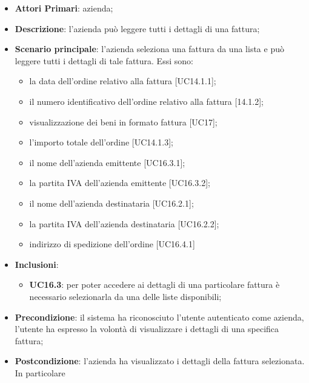\begin{itemize}
	\item \textbf{Attori Primari}: azienda;
	\item \textbf{Descrizione}: l'azienda può leggere tutti i dettagli di una fattura;
	\item \textbf{Scenario principale}: l'azienda seleziona una fattura da una lista e può leggere tutti i dettagli di tale fattura. Essi sono:
	\begin{itemize}
		\item la data dell'ordine relativo alla fattura [UC14.1.1];
		\item il numero identificativo dell'ordine relativo alla fattura [14.1.2];
		\item visualizzazione dei beni in formato fattura [UC17];
		\item l'importo totale dell'ordine [UC14.1.3];
		\item il nome dell'azienda emittente [UC16.3.1];
		\item la partita IVA dell'azienda emittente [UC16.3.2];
		\item il nome dell'azienda destinataria [UC16.2.1];
		\item la partita IVA dell'azienda destinataria [UC16.2.2];
		\item indirizzo di spedizione dell'ordine [UC16.4.1]
	\end{itemize}
	\item \textbf{Inclusioni}:
	\begin{itemize}
		\item \textbf{UC16.3}: per poter accedere ai dettagli di una particolare fattura è necessario selezionarla da una delle liste disponibili;
	\end{itemize}
	\item \textbf{Precondizione}: il sistema ha riconosciuto l'utente autenticato come azienda, l'utente ha espresso la volontà di visualizzare i dettagli di una specifica fattura;
	\item \textbf{Postcondizione}: l'azienda ha visualizzato i dettagli della fattura selezionata. In particolare 
\end{itemize} 
